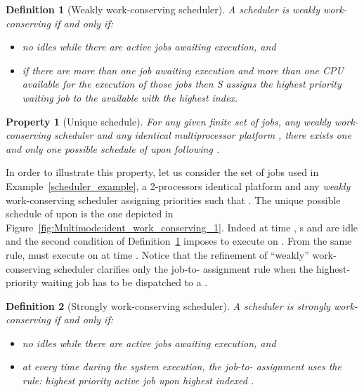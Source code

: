 \documentclass{article}
\newtheorem{Definition}{Definition}
\newtheorem{validity test}{Validity Test}
\newtheorem{Property}{Property}
\begin{document}
\begin{Definition}[Weakly work-conserving scheduler]
\label{def:Multimode:weakly_work_conserving}
A scheduler  is weakly work-conserving if and only if:
\begin{itemize}
\item no  idles while there are active jobs awaiting execution, and
\item if there are more than one job awaiting execution and more than one CPU available for the execution of those jobs then {\cal S} assigns the highest priority waiting job to the available  with the highest index. 
\end{itemize}
\end{Definition}

\begin{Property}[Unique schedule]
For any given finite set  of jobs, any \emph{weakly} work-conserving scheduler  and any \emph{identical} multiprocessor platform , there exists \emph{one and only one} possible schedule of  upon  following . 
\end{Property}

In order to illustrate this property, let us consider the set of  jobs used in Example~\ref{scheduler_example}, a 2-processors identical platform  and any \emph{weakly} work-conserving scheduler assigning priorities such that . The unique possible schedule of  upon  is the one depicted in Figure~\ref{fig:Multimode:ident_work_conserving_1}. Indeed at time , s  and  are idle and the second condition of Definition~\ref{def:Multimode:weakly_work_conserving} imposes  to execute on . From the same rule,  must execute on  at time . Notice that the refinement of ``weakly'' work-conserving scheduler clarifies only the job-to- assignment rule when the highest-priority waiting job has to be dispatched to a . 

\begin{Definition}[Strongly work-conserving scheduler]
\label{def:Multimode:strongly_work_conserving}
A scheduler  is strongly work-conserving if and only if:
\begin{itemize}
\item no  idles while there are active jobs awaiting execution, and 
\item at \emph{every time} during the system execution, the job-to- assignment uses the rule: highest priority active job upon highest indexed . 
\end{itemize}
\end{Definition}
\end{document}
